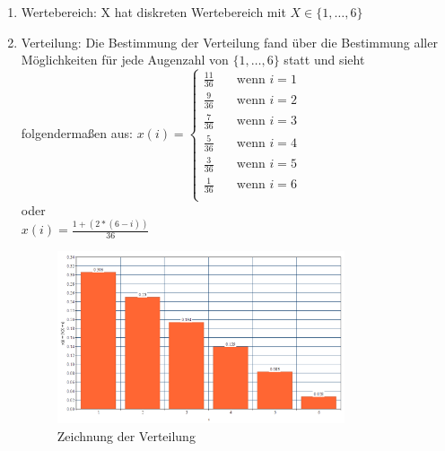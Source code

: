 \documentclass[%
10pt,              %
ngerman,           %
a4paper,           %
DIV11,             %
]{scrartcl}%
\begin{document}
\begin{enumerate}
	\item Wertebereich: X hat diskreten Wertebereich mit $X \in \{1, \dots, 6 \}$
	\item Verteilung: Die Bestimmung der Verteilung fand über die Bestimmung aller Möglichkeiten für jede Augenzahl von $\{1, \dots, 6 \}$ statt und sieht folgendermaßen aus:\newline
	$x(i) = 
    \begin{cases}
        \frac{11}{36} & \quad \text{wenn } i = 1\\
        \frac{9}{36} & \quad \text{wenn } i = 2\\
        \frac{7}{36} & \quad \text{wenn } i = 3\\
        \frac{5}{36} & \quad \text{wenn } i = 4\\
        \frac{3}{36} & \quad \text{wenn } i = 5\\
        \frac{1}{36} & \quad \text{wenn } i = 6\\
    \end{cases}$
    \\
    oder
    \\
    $x(i) = \frac{1 + (2 * (6 - i))}{36}$
    \\
     
    \begin{figure}[!htbp]
      \centering
        \caption{Zeichnung der Verteilung}
        \includegraphics[width=0.8\textwidth]{xminvert}
    \end{figure}
	

\end{enumerate}
\end{document}

